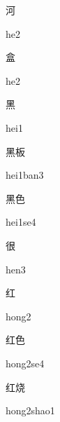 \begin{verbete}[he2]{河}
\begin{pronuncia}{he2}
\end{pronuncia}
\end{verbete}

\begin{verbete}[he2]{盒}
\begin{pronuncia}{he2}
\end{pronuncia}
\end{verbete}

\begin{verbete}[hei1]{黑}
\begin{pronuncia}{hei1}
\end{pronuncia}
\end{verbete}

\begin{verbete}{黑板}
\begin{pronuncia}{hei1ban3}
\end{pronuncia}
\end{verbete}

\begin{verbete}[hei1se4]{黑色}
\begin{pronuncia}{hei1se4}
\end{pronuncia}
\end{verbete}

\begin{verbete}[hen3]{很}
\begin{pronuncia}{hen3}
\end{pronuncia}
\end{verbete}

\begin{verbete}[hong2]{红}
\begin{pronuncia}{hong2}
\end{pronuncia}
\end{verbete}

\begin{verbete}[hong2se4]{红色}
\begin{pronuncia}{hong2se4}
\end{pronuncia}
\end{verbete}

\begin{verbete}{红烧}
\begin{pronuncia}{hong2shao1}
\end{pronuncia}
\end{verbete}

